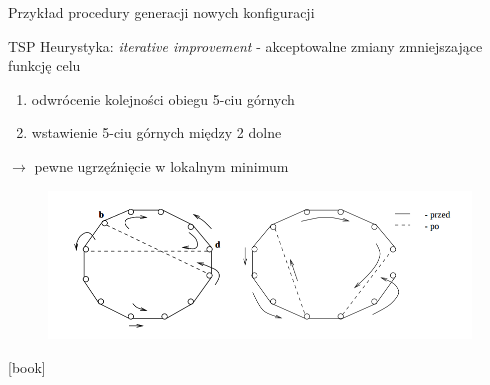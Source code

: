 
	\begin{frame}{Przykład procedury generacji nowych konfiguracji}
		\begin{exampleblock}{TSP \cite{lin}}
			Heurystyka: \textit{iterative improvement} - akceptowalne zmiany zmniejszające funkcję celu
			\begin{enumerate}
				\item odwrócenie kolejności obiegu 5-ciu górnych
				\item wstawienie 5-ciu górnych między 2 dolne
			\end{enumerate}
			$\rightarrow$ pewne ugrzęźnięcie w lokalnym minimum
			\begin{figure}
				\includegraphics[height=0.32\textheight]{img/18/tsp}
			\end{figure}
		\end{exampleblock}
		\begin{thebibliography}{9}
			[book]
		\end{thebibliography}
	\end{frame}
